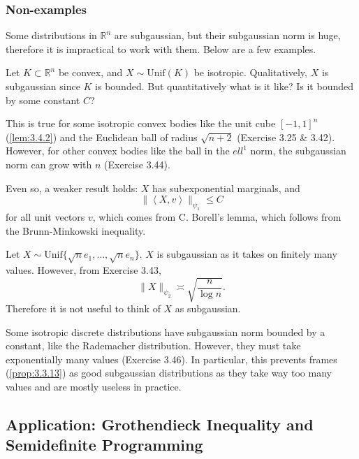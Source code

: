 \subsubsection{Non-examples}
Some distributions in $\mathbb{R}^n$ are subgaussian, but their subgaussian norm is huge, therefore it is 
impractical to work with them. Below are a few examples.

\begin{example}
\label{ex:3.4.6}
Let $K \subset \mathbb{R}^n$ be convex, and $X \sim \mathrm{Unif}(K)$ be isotropic. Qualitatively, $X$ is 
subgaussian since $K$ is bounded. But quantitatively what is it like? Is it bounded by some constant $C$?

This is true for some isotropic convex bodies like the unit cube $[-1, 1]^n$ (\cref{lem:3.4.2}) and 
the Euclidean ball of radius $\sqrt{n + 2}$ (Exercise 3.25 \& 3.42). However, for other convex bodies like the 
ball in the $ell^1$ norm, the subgaussian norm can grow with $n$ (Exercise 3.44).

Even so, a weaker result holds: $X$ has subexponential marginals, and 
\[ \lVert \left\langle X, v \right\rangle \rVert_{\psi_1} \leq C \]
for all unit vectors $v$, which comes from C. Borell's lemma, which follows from the Brunn-Minkowski inequality.
\end{example}

\begin{example}
\label{ex:3.4.7}
Let $X \sim \mathrm{Unif}\{\sqrt{n}e_1, \dots, \sqrt{n}e_n\}$. $X$ is subgaussian as it takes on finitely 
many values. However, from Exercise 3.43, 
\[ \lVert X \rVert_{\psi_2} \asymp \sqrt{\frac{n}{\log{n}}}. \]
Therefore it is not useful to think of $X$ as subgaussian.
\end{example}

\begin{example}
Some isotropic discrete distributions have subgaussian norm bounded by a constant, like the Rademacher 
distribution. However, they must take exponentially many values (Exercise 3.46). In particular, this prevents 
frames (\cref{prop:3.3.13}) as good subgaussian distributions as they take way too many values and are mostly 
useless in practice.
\end{example}


\subsection{Application: Grothendieck Inequality and Semidefinite Programming}

